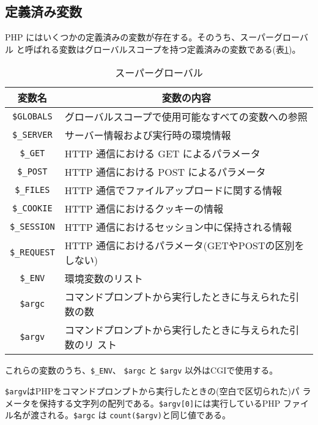 \subsection{定義済み変数}
PHP にはいくつかの定義済みの変数が存在する。そのうち、スーパーグローバル
と呼ばれる変数はグローバルスコープを持つ定義済みの変数である(表\ref{superglobal})。
\begin{table}[ht]
 \caption{スーパーグローバル}\label{superglobal}
\begin{center}
 \begin{tabular}{|c|m{}|}\hline
  変数名& \multicolumn{1}{c|}{変数の内容}\\\hline
\Verb+$GLOBALS+ & グローバルスコープで使用可能なすべての変数への参照\\\hline
\Verb+$_SERVER+ & サーバー情報および実行時の環境情報\\\hline
\Verb+$_GET+ & HTTP 通信における GET によるパラメータ\\\hline
\Verb+$_POST+ & HTTP 通信における POST によるパラメータ\\\hline
\Verb+$_FILES+ & HTTP 通信でファイルアップロードに関する情報\\\hline
  \Verb+$_COOKIE+ & HTTP 通信におけるクッキーの情報\\\hline
\Verb+$_SESSION+ &HTTP 通信におけるセッション中に保持される情報 \\\hline
\Verb+$_REQUEST+ & HTTP 通信におけるパラメータ(GETやPOSTの区別をしない)\\\hline
\Verb+$_ENV+  &  環境変数のリスト\\\hline
\Verb+$argc+  &  コマンドプロンプトから実行したときに与えられた引数の数\\\hline
\Verb+$argv+  &  コマンドプロンプトから実行したときに与えられた引数のリ
      スト\\\hline
 \end{tabular}
\end{center}
\end{table}

これらの変数のうち、{\texttt{\$\_ENV}}、 \Verb+$argc+ と
\Verb+$argv+ 以外はCGIで使用する。

\Verb+$argv+はPHPをコマンドプロンプトから実行したときの(空白で区切られた)パ
ラメータを保持する文字列の配列である。\Verb+$argv[0]+には実行しているPHP
ファイル名が渡される。\Verb+$argc+ は \Verb+count($argv)+と同じ値である。
